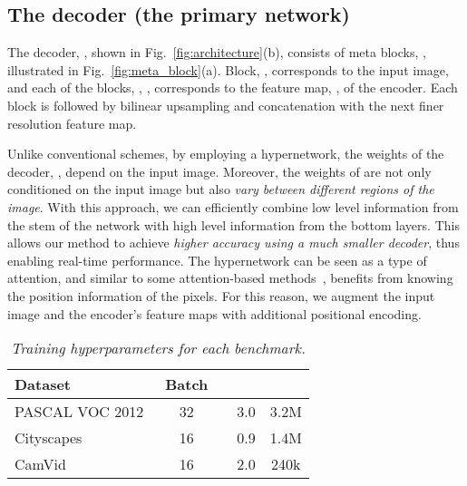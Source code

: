 \documentclass[final]{cvpr}
\begin{document}
\subsection{The decoder (the primary network)}
\label{subsec:Decoder}
The decoder, , shown in Fig.~\ref{fig:architecture}(b), consists of  meta blocks, , illustrated in Fig.~\ref{fig:meta_block}(a). Block, , corresponds to the input image, and each of the blocks, , , corresponds to the feature map, , of the encoder. Each block is followed by bilinear upsampling and concatenation with the next finer resolution feature map.

Unlike conventional schemes, by employing a hypernetwork, the weights of the decoder, , depend on the input image. Moreover, the weights of  are not only conditioned on the input image but also {\em vary between different regions of the image}. With this approach, we can efficiently combine low level information from the stem of the network with high level information from the bottom layers. This allows our method to achieve {\em higher accuracy using a much smaller decoder}, thus enabling real-time performance. The hypernetwork can be seen as a type of attention, and similar to some attention-based methods~\cite{ho2019axial,parmar2019stand}, 
 benefits from knowing the position information of the pixels. For this reason, we augment the input image and the encoder's feature maps with additional positional encoding.


\begin{table}[t]
\begin{center}
{
\begin{tabular}{l c c c c }
  \toprule
  Dataset & Batch &  &  &  \\ [0.5ex] 
  \hline
  PASCAL VOC 2012~\cite{everingham2010pascal} & 32 &  & 3.0 & 3.2M \\
  Cityscapes~\cite{cordts2016cityscapes} & 16 &  & 0.9 & 1.4M \\
  CamVid~\cite{brostow2009semantic} & 16 &  & 2.0 & 240k \\
  \bottomrule
\end{tabular}
}
\end{center}
\caption{\emph{Training hyperparameters for each benchmark.}}
\label{tab:training_details}
\end{table}
\end{document}
